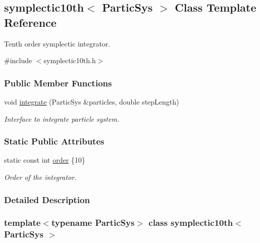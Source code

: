 \hypertarget{classsymplectic10th}{}\subsection{symplectic10th$<$ Partic\+Sys $>$ Class Template Reference}
\label{classsymplectic10th}


Tenth order symplectic integrator.  




{\ttfamily \#include $<$symplectic10th.\+h$>$}

\subsubsection*{Public Member Functions}
\begin{DoxyCompactItemize}
\item 
void \mbox{\hyperlink{classsymplectic10th_a6fd1d57c1504d7a603056ca021b179b0}{integrate}} (Partic\+Sys \&particles, double step\+Length)
\begin{DoxyCompactList}\small\item\em Interface to integrate particle system. \end{DoxyCompactList}\end{DoxyCompactItemize}
\subsubsection*{Static Public Attributes}
\begin{DoxyCompactItemize}
\item 
static const int \mbox{\hyperlink{classsymplectic10th_af1cb88e94e3022b5bf90091d03c609a4}{order}} \{10\}
\begin{DoxyCompactList}\small\item\em Order of the integrator. \end{DoxyCompactList}\end{DoxyCompactItemize}


\subsubsection{Detailed Description}
\subsubsection*{template$<$typename Partic\+Sys$>$\newline
class symplectic10th$<$ Partic\+Sys $>$}

